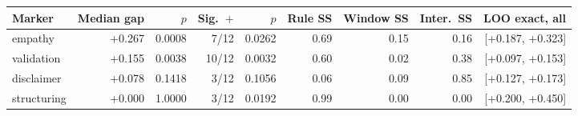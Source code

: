 \begin{tabular}{lrrrrrrrr}
\toprule
Marker & Median gap & $p$ & Sig.\ $+$ & $p$ & Rule SS & Window SS & Inter.\ SS & LOO exact, all \\
\midrule
empathy & +0.267 & 0.0008 & 7/12 & 0.0262 & 0.69 & 0.15 & 0.16 & [+0.187, +0.323] \\
validation & +0.155 & 0.0038 & 10/12 & 0.0032 & 0.60 & 0.02 & 0.38 & [+0.097, +0.153] \\
disclaimer & +0.078 & 0.1418 & 3/12 & 0.1056 & 0.06 & 0.09 & 0.85 & [+0.127, +0.173] \\
structuring & +0.000 & 1.0000 & 3/12 & 0.0192 & 0.99 & 0.00 & 0.00 & [+0.200, +0.450] \\
\bottomrule
\end{tabular}
